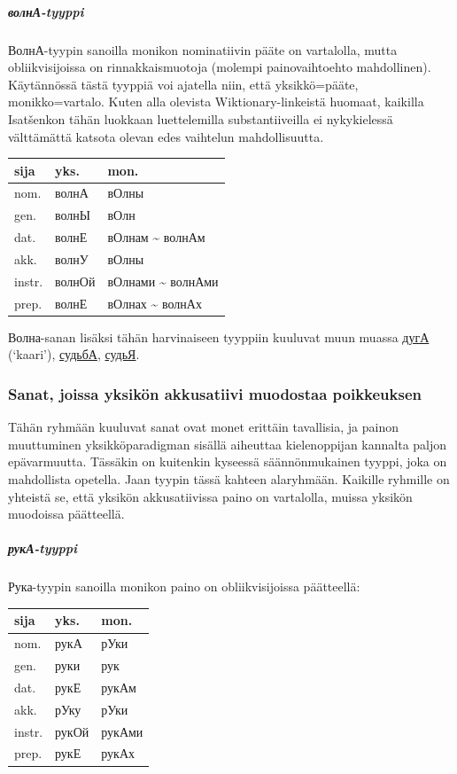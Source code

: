 \documentclass[]{scrreprt}
\begin{document}
\subparagraph{волнА-tyyppi}\label{ux432ux43eux43bux43dux430-tyyppi}

ВолнА-tyypin sanoilla monikon nominatiivin pääte on vartalolla, mutta
obliikvisijoissa on rinnakkaismuotoja (molempi painovaihtoehto
mahdollinen). Käytännössä tästä tyyppiä voi ajatella niin, että
yksikkö=pääte, monikko=vartalo. Kuten alla olevista Wiktionary-linkeistä
huomaat, kaikilla Isatšenkon tähän luokkaan luettelemilla
substantiiveilla ei nykykielessä välttämättä katsota olevan edes
vaihtelun mahdollisuutta.

\begin{longtable}[c]{@{}lll@{}}
\toprule
sija & yks. & mon.\tabularnewline
\midrule
\endhead
nom. & волнА & вОлны\tabularnewline
gen. & волнЫ & вОлн\tabularnewline
dat. & волнЕ & вОлнам \textasciitilde{} волнАм\tabularnewline
akk. & волнУ & вОлны\tabularnewline
instr. & волнОй & вОлнами \textasciitilde{} волнАми\tabularnewline
prep. & волнЕ & вОлнах \textasciitilde{} волнАх\tabularnewline
\bottomrule
\end{longtable}

Волна-sanan lisäksi tähän harvinaiseen tyyppiin kuuluvat muun muassa
\href{http://ru.wiktionary.org/wiki/\%D0\%B4\%D1\%83\%D0\%B3\%D0\%B0}{дугА}
(`kaari'),
\href{http://ru.wiktionary.org/wiki/\%D1\%81\%D1\%83\%D0\%B4\%D1\%8C\%D0\%B1\%D0\%B0}{судьбА},
\href{http://ru.wiktionary.org/wiki/\%D1\%81\%D1\%83\%D0\%B4\%D1\%8C\%D1\%8F}{судьЯ}.

\subsubsection{Sanat, joissa yksikön akkusatiivi muodostaa
poikkeuksen}\label{sanat-joissa-yksikuxf6n-akkusatiivi-muodostaa-poikkeuksen}

Tähän ryhmään kuuluvat sanat ovat monet erittäin tavallisia, ja painon
muuttuminen yksikköparadigman sisällä aiheuttaa kielenoppijan kannalta
paljon epävarmuutta. Tässäkin on kuitenkin kyseessä säännönmukainen
tyyppi, joka on mahdollista opetella. Jaan tyypin tässä kahteen
alaryhmään. Kaikille ryhmille on yhteistä se, että yksikön
akkusatiivissa paino on vartalolla, muissa yksikön muodoissa päätteellä.

\subparagraph{рукА-tyyppi}\label{ux440ux443ux43aux430-tyyppi}

Рука-tyypin sanoilla monikon paino on obliikvisijoissa päätteellä:

\begin{longtable}[c]{@{}lll@{}}
\toprule
sija & yks. & mon.\tabularnewline
\midrule
\endhead
nom. & рукА & рУки\tabularnewline
gen. & руки & рук\tabularnewline
dat. & рукЕ & рукАм\tabularnewline
akk. & рУку & рУки\tabularnewline
instr. & рукОй & рукАми\tabularnewline
prep. & рукЕ & рукАх\tabularnewline
\bottomrule
\end{longtable}
\end{document}
